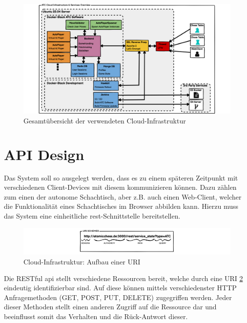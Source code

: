 \begin{figure}
\centering
\includegraphics{images/ATC_Cloud_Architecture.png}
\caption{Gesamtübersicht der verwendeten Cloud-Infrastruktur
\label{ATC_Cloud_Architecture}}
\end{figure}

\hypertarget{api-design}{%
\section{API Design}\label{api-design}}

Das System soll so ausgelegt werden, dass es zu einem späteren Zeitpunkt
mit verschiedenen Client-Devices mit diesem kommunizieren können. Dazu
zählen zum einen der autonome Schachtisch, aber z.B. auch einen
Web-Client, welcher die Funktionalität eines Schachtisches im Browser
abbilden kann. Hierzu muss das System eine einheitliche
\gls{rest}-Schnittstelle bereitstellen.

\begin{figure}
\centering
\includegraphics{images/ATC_URI_SCHEMES.png}
\caption{Cloud-Infrastruktur: Aufbau einer URI \label{ATC_URI_SCHEMES}}
\end{figure}

Die RESTful \gls{api} stellt verschiedene Ressourcen bereit, welche
durch eine URI \ref{ATC_URI_SCHEMES} eindeutig identifizierbar sind. Auf
diese können mittels verschiedenster HTTP Anfragemethoden (GET, POST,
PUT, DELETE) zugegriffen werden. Jeder dieser Methoden stellt einen
anderen Zugriff auf die Ressource dar und beeinflusst somit das
Verhalten und die Rück-Antwort dieser.

